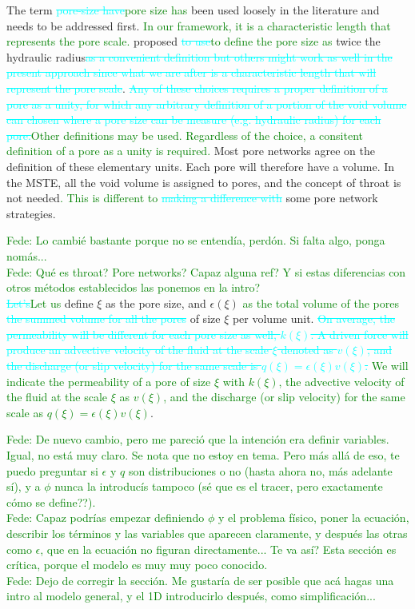 \documentclass{CFD2011}
\newcommand{\Fede}[1]{\textcolor{green}{Fede: #1} \\}
\newcommand{\newf}[1]{\textcolor{green}{#1}}
\newcommand{\nof}[1]{\textcolor{cyan}{{\sout{#1}}}}
\begin{document}
The term \nof{pore-size have}\newf{pore size has} been used loosely in the literature and needs to be addressed first. \newf{In our framework, it is a characteristic length that represents the pore scale. }\cite{Dullien} proposed \nof{to use}\newf{to define the pore size as} twice the hydraulic radius\nof{as a convenient definition but others might work as well in the present approach since what we are after is a characteristic length that will represent the pore scale}. \nof{Any of these choices requires a proper definition of a pore as a unity, for which any arbitrary definition of a portion of the void volume can chosen where a pore size can be measure (e.g. hydraulic radius) for each pore.}\newf{Other definitions may be used. Regardless of the choice, a consitent definition of a pore as a unity is required.} Most pore networks agree on the definition of these elementary units. Each pore will therefore have a volume. In the MSTE, all the void volume is assigned to pores, and the concept of throat is not needed\newf{. This is different to} \nof{making a difference with }some pore network strategies. 

\Fede{Lo cambi\'e bastante porque no se entend\'ia, perd\'on. Si falta algo, ponga nom\'as...}
\Fede{Qu\'e es throat? Pore networks? Capaz alguna ref? Y si estas diferencias con otros m\'etodos establecidos las ponemos en la intro?}

\nof{Let's}\newf{Let us} define $\xi$ as the pore size, and $\epsilon(\xi)$ \newf{as the total volume of the pores} \nof{the summed volume for all the pores }of size $\xi$ per volume unit.
\nof{On average, the permeability will be different for each pore size as well, $k(\xi)$. A driven force will produce an advective velocity of the fluid at the scale $\xi$ denoted as $v(\xi)$, and the discharge (or slip velocity) for the same scale is $q(\xi)=\epsilon(\xi) v(\xi)$.}
\newf{We will indicate the permeability of a pore of size $\xi$ with $k(\xi)$, the advective velocity of the fluid at the scale $\xi$ as $v(\xi)$, and the discharge (or slip velocity) for the same scale as $q(\xi)=\epsilon(\xi) v(\xi)$}.

\Fede{De nuevo cambio, pero me pareci\'o que la intenci\'on era definir variables. Igual, no est\'a muy claro. Se nota que no estoy en tema. Pero m\'as all\'a de eso, te puedo preguntar si $\epsilon$ y $q$ son distribuciones o no (hasta ahora no, m\'as adelante s\'i), y a $\phi$ nunca la introduc\'is tampoco (s\'e que es el tracer, pero exactamente c\'omo se define??).}
\Fede{Capaz podr\'ias empezar definiendo $\phi$ y el problema f\'isico, poner la ecuaci\'on, describir los t\'erminos y las variables que aparecen claramente, y despu\'es las otras como $\epsilon$, que en la ecuaci\'on no figuran directamente... Te va as\'i? Esta secci\'on es cr\'itica, porque el modelo es muy muy poco conocido.}
\Fede{Dejo de corregir la secci\'on. Me gustar\'ia de ser posible que ac\'a hagas una intro al modelo general, y el 1D introducirlo despu\'es, como simplificaci\'on... }
\end{document}
